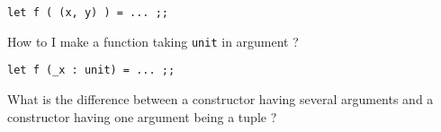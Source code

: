 \documentclass[10pt,a4paper]{article}
\begin{document}
\medskip
{}
\begin{adjustwidth}{2em}{0em}
\lstinline"let f ( (x, y) ) = ... ;;"
\end{adjustwidth}



\bigskip
{}
\begin{adjustwidth}{2em}{0em}
How to I make a function taking {\tt unit} in argument ?
\end{adjustwidth}

\medskip
{}
\begin{adjustwidth}{2em}{0em}
\lstinline"let f (_x : unit) = ... ;;"
\end{adjustwidth}



\bigskip
{}
\begin{adjustwidth}{2em}{0em}
What is the difference between a constructor having several
arguments and a constructor having one argument being a tuple ?
\end{adjustwidth}
\end{document}

